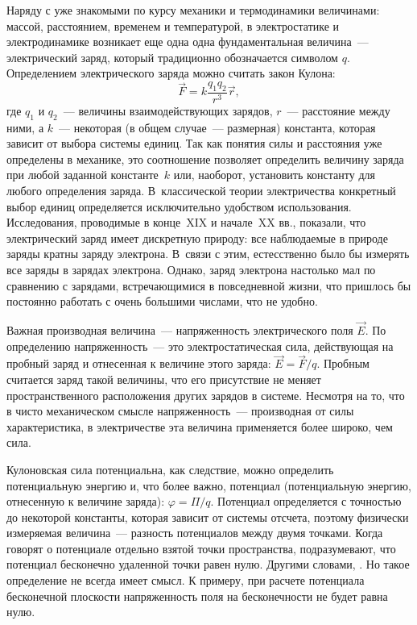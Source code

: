 

Наряду с уже знакомыми по курсу механики и термодинамики величинами: массой,
расстоянием, временем и температурой, в электростатике и электродинамике
возникает еще одна одна фундаментальная величина~--- электрический заряд,
который традиционно обозначается символом $q$. Определением электрического
заряда можно считать закон Кулона:
\begin{equation}
	\vec{F} = k \frac{q_1 q_2}{r^3}\vec{r},
\end{equation}
где $q_1$ и $q_2$~--- величины взаимодействующих зарядов, $r$~--- расстояние
между ними, а $k$~--- некоторая (в общем случае~--- размерная) константа,
которая зависит от выбора системы единиц. Так как понятия силы и расстояния уже
определены в механике, это соотношение позволяет определить величину заряда при
любой заданной константе~$k$ или, наоборот, установить константу для любого
определения заряда. В~классической теории электричества конкретный выбор единиц
определяется исключительно удобством использования.
Исследования, проводимые в конце~XIX и начале~XX вв., показали, что
электрический заряд имеет дискретную природу: все наблюдаемые
в природе заряды кратны заряду электрона. В~связи с этим, естесственно было
бы измерять все заряды в зарядах электрона. Однако, заряд электрона настолько
мал по сравнению с зарядами, встречающимися в повседневной жизни, что пришлось
бы постоянно работать с очень большими числами, что не удобно.

Важная производная величина~--- напряженность электрического поля $\vec{E}$. По
определению напряженность~--- это электростатическая сила, действующая на
пробный заряд и отнесенная к величине этого заряда: $\vec{E} = \vec{F}/q$.
Пробным считается заряд такой величины, что его присутствие не меняет
пространственного расположения других зарядов в системе. Несмотря на то, что в
чисто механическом смысле напряженность~--- производная от силы характеристика,
в электричестве эта величина применяется более широко, чем сила.

Кулоновская сила потенциальна, как следствие, можно определить потенциальную
энергию и, что более важно, потенциал (потенциальную энергию, отнесенную к
величине заряда): $\varphi = \Pi/q$. Потенциал определяется с точностью до
некоторой константы, которая зависит от системы отсчета, поэтому физически
измеряемая величина~--- разность потенциалов между двумя точками. Когда говорят
о потенциале отдельно взятой точки пространства, подразумевают, что потенциал
бесконечно удаленной точки равен нулю. Другими словами, . Но такое определение не всегда имеет смысл. К примеру, при
расчете потенциала бесконечной плоскости напряженность поля на бесконечности не
будет равна нулю.

